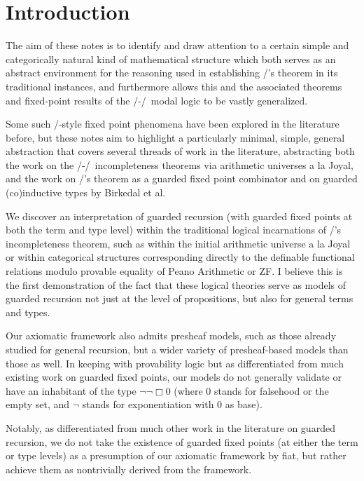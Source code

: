 \filestart

\section{Introduction}
The aim of these notes is to identify and draw attention to a certain simple and categorically natural kind of mathematical structure which both serves as an abstract environment for the reasoning used in establishing \Loeb/'s theorem in its traditional instances, and furthermore allows this and the associated theorems and fixed-point results of the \Goedel/-\Loeb/\ modal logic to be vastly generalized.

Some such \Loeb/-style fixed point phenomena have been explored in the literature before, but these notes aim to highlight a particularly minimal, simple, general abstraction that covers several threads of work in the literature, abstracting both the work on the \Goedel/-\Loeb/\ incompleteness theorems via arithmetic universes a la Joyal, and the work on \Loeb/'s theorem as a guarded fixed point combinator and on guarded (co)inductive types by Birkedal et al.

We discover an interpretation of guarded recursion (with guarded fixed points at both the term and type level) within the traditional logical incarnations of \Goedel/'s incompleteness theorem, such as within the initial arithmetic universe a la Joyal or within categorical structures corresponding directly to the definable functional relations modulo provable equality of Peano Arithmetic or ZF. I believe this is the first demonstration of the fact that these logical theories serve as models of guarded recursion not just at the level of propositions, but also for general terms and types.

Our axiomatic framework also admits presheaf models, such as those already studied for general recursion, but a wider variety of presheaf-based models than those as well. In keeping with provability logic but as differentiated from much existing work on guarded fixed points, our models do not generally validate or have an inhabitant of the type $\neg \neg \Box 0$ (where $0$ stands for falsehood or the empty set, and $\neg$ stands for exponentiation with $0$ as base).

Notably, as differentiated from much other work in the literature on guarded recursion, we do not take the existence of guarded fixed points (at either the term or type levels) as a presumption of our axiomatic framework by fiat, but rather achieve them as nontrivially derived from the framework.

